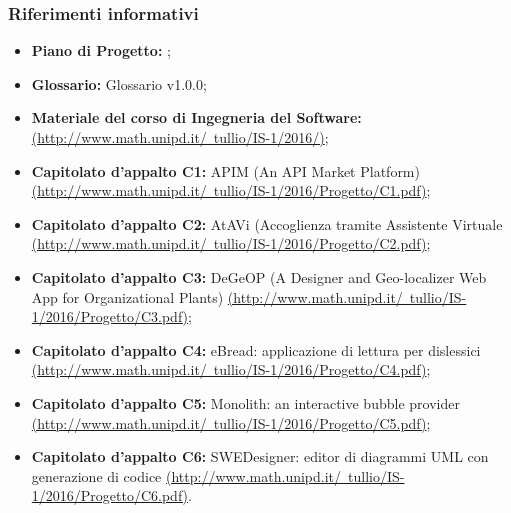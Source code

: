 \documentclass[../StudioDiFattibilita.tex]{subfiles}
\begin{document}
        \subsubsection{Riferimenti informativi}
        \begin{itemize}
            \item \textbf{Piano di Progetto:} \pianodiprogettov;
            \item \textbf{Glossario:} Glossario v1.0.0;
            \item\textbf{Materiale del corso di Ingegneria del Software:} \href{http://www.math.unipd.it/~tullio/IS-1/2016/}{(http://www.math.unipd.it/~tullio/IS-1/2016/)};
            \item\textbf{Capitolato d'appalto C1:} APIM (An API Market Platform) \href{http://www.math.unipd.it/~tullio/IS-1/2016/Progetto/C1.pdf}{(http://www.math.unipd.it/~tullio/IS-1/2016/Progetto/C1.pdf)};
            \item\textbf{Capitolato d'appalto C2:} AtAVi (Accoglienza tramite Assistente Virtuale \href{http://www.math.unipd.it/~tullio/IS-1/2016/Progetto/C2.pdf}{(http://www.math.unipd.it/~tullio/IS-1/2016/Progetto/C2.pdf)};
            \item\textbf{Capitolato d'appalto C3:} DeGeOP (A Designer and Geo-localizer Web App for Organizational Plants) \href{http://www.math.unipd.it/~tullio/IS-1/2016/Progetto/C3.pdf}{(http://www.math.unipd.it/~tullio/IS-1/2016/Progetto/C3.pdf)};
            \item\textbf{Capitolato d'appalto C4:} eBread: applicazione di lettura per dislessici \href{http://www.math.unipd.it/~tullio/IS-1/2016/Progetto/C4.pdf}{(http://www.math.unipd.it/~tullio/IS-1/2016/Progetto/C4.pdf)};
            \item\textbf{Capitolato d'appalto C5:} Monolith: an interactive bubble provider \href{http://www.math.unipd.it/~tullio/IS-1/2016/Progetto/C5.pdf}{(http://www.math.unipd.it/~tullio/IS-1/2016/Progetto/C5.pdf)};
            \item\textbf{Capitolato d'appalto C6:} SWEDesigner: editor di diagrammi UML con  generazione di codice \href{http://www.math.unipd.it/~tullio/IS-1/2016/Progetto/C6.pdf}{(http://www.math.unipd.it/~tullio/IS-1/2016/Progetto/C6.pdf)}.
        \end{itemize}
\end{document}
